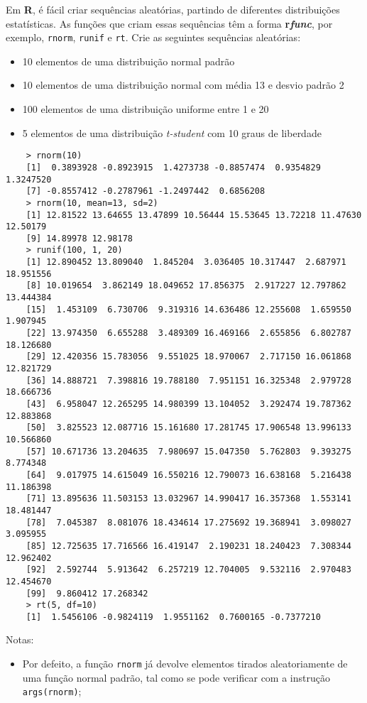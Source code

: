\documentclass{exam}
\begin{document}
\begin{questions}
\question Em \textbf{R}, é fácil criar sequências aleatórias, partindo de diferentes distribuições estatísticas. As funções que criam essas sequências têm a forma \textbf{r\textit{func}}, por exemplo, \texttt{rnorm}, \texttt{runif} e \texttt{rt}. Crie as seguintes sequências aleatórias:
\begin{itemize}
\item 10 elementos de uma distribuição normal padrão
\item 10 elementos de uma distribuição normal com média 13 e desvio padrão 2
\item 100 elementos de uma distribuição uniforme entre 1 e 20
\item 5 elementos de uma distribuição \textit{t-student} com 10 graus de liberdade
\end{itemize}
\begin{solution}
	\begin{verbatim}
	> rnorm(10)
	[1]  0.3893928 -0.8923915  1.4273738 -0.8857474  0.9354829  1.3247520
	[7] -0.8557412 -0.2787961 -1.2497442  0.6856208
	> rnorm(10, mean=13, sd=2)
	[1] 12.81522 13.64655 13.47899 10.56444 15.53645 13.72218 11.47630 12.50179
	[9] 14.89978 12.98178
	> runif(100, 1, 20)
	[1] 12.890452 13.809040  1.845204  3.036405 10.317447  2.687971 18.951556
	[8] 10.019654  3.862149 18.049652 17.856375  2.917227 12.797862 13.444384
	[15]  1.453109  6.730706  9.319316 14.636486 12.255608  1.659550  1.907945
	[22] 13.974350  6.655288  3.489309 16.469166  2.655856  6.802787 18.126680
	[29] 12.420356 15.783056  9.551025 18.970067  2.717150 16.061868 12.821729
	[36] 14.888721  7.398816 19.788180  7.951151 16.325348  2.979728 18.666736
	[43]  6.958047 12.265295 14.980399 13.104052  3.292474 19.787362 12.883868
	[50]  3.825523 12.087716 15.161680 17.281745 17.906548 13.996133 10.566860
	[57] 10.671736 13.204635  7.980697 15.047350  5.762803  9.393275  8.774348
	[64]  9.017975 14.615049 16.550216 12.790073 16.638168  5.216438 11.186398
	[71] 13.895636 11.503153 13.032967 14.990417 16.357368  1.553141 18.481447
	[78]  7.045387  8.081076 18.434614 17.275692 19.368941  3.098027  3.095955
	[85] 12.725635 17.716566 16.419147  2.190231 18.240423  7.308344 12.962402
	[92]  2.592744  5.913642  6.257219 12.704005  9.532116  2.970483 12.454670
	[99]  9.860412 17.268342
	> rt(5, df=10)
	[1]  1.5456106 -0.9824119  1.9551162  0.7600165 -0.7377210
	\end{verbatim}
	Notas:
	\begin{itemize}
		\item Por defeito, a função \texttt{rnorm} já devolve elementos tirados aleatoriamente de uma função normal padrão, tal como se pode verificar com a instrução \texttt{args(rnorm)};

\end{itemize}
\end{solution}
\end{questions}
\end{document}
